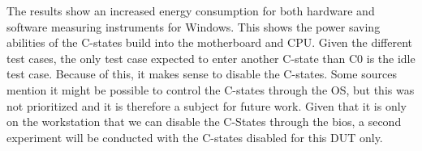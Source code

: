 

The results show an increased energy consumption for both hardware and software measuring instruments for Windows. This shows the power saving abilities of the C-states build into the motherboard and CPU. Given the different test cases, the only test case expected to enter another C-state than C0 is the idle test case. Because of this, it makes sense to disable the C-states. Some sources mention it might be possible to control the C-states through the OS\cite{CMete,CLinux}, but this was not prioritized and it is therefore a subject for future work. Given that it is only on the workstation that we can disable the C-States through the bios, a second experiment will be conducted with the C-states disabled for this DUT only.
